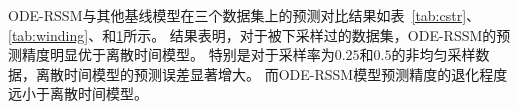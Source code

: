 \begin{table}
{\begin{tabular}{l|ll|ll|ll|ll|ll}
\bottomrule
\end{tabular}}
\label{tab:thickening}
\end{table}

ODE-RSSM与其他基线模型在三个数据集上的预测对比结果如表~\ref{tab:cstr}、\ref{tab:winding}、和\ref{tab:thickening}所示。
结果表明，对于被下采样过的数据集，ODE-RSSM的预测精度明显优于离散时间模型。
特别是对于采样率为$0.25$和$0.5$的非均匀采样数据，离散时间模型的预测误差显著增大。
而ODE-RSSM模型预测精度的退化程度远小于离散时间模型。

